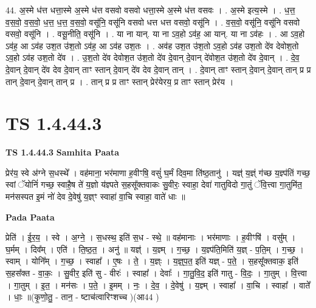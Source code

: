 \documentclass[17pt]{extarticle}
\begin{document}
44. अ॒स्मे ध॑त्त धत्ता॒स्मे अ॒स्मे ध॑त्त वसवो वसवो धत्ता॒स्मे अ॒स्मे ध॑त्त वसवः । . अ॒स्मे इत्य॒स्मे । . ध॒त्त॒ व॒स॒वो॒ व॒स॒वो॒ ध॒त्त॒ ध॒त्त॒ व॒स॒वो॒ वसू॑नि॒ वसू॑नि वसवो धत्त धत्त वसवो॒ वसू॑नि । . व॒स॒वो॒ वसू॑नि॒ वसू॑नि वसवो वसवो॒ वसू॑नि । . वसू॒नीति॒ वसू॑नि । . या ना यान्. या ना ऽव॒हो ऽव॑ह॒ आ यान्. या ना ऽव॑हः । . आ ऽव॒हो ऽव॑ह॒ आ ऽव॑ह उश॒त उ॑श॒तो ऽव॑ह॒ आ ऽव॑ह उश॒तः । . अव॑ह उश॒त उ॑श॒तो ऽव॒हो ऽव॑ह उश॒तो दे॑व देवोश॒तो ऽव॒हो ऽव॑ह उश॒तो दे॑व । . उ॒श॒तो दे॑व देवोश॒त उ॑श॒तो दे॑व दे॒वान् दे॒वान् दे॑वोश॒त उ॑श॒तो दे॑व दे॒वान् । . दे॒व॒ दे॒वान् दे॒वान् दे॑व देव दे॒वान् ताꣳ स्तान् दे॒वान् दे॑व देव दे॒वान् तान् । . दे॒वान् ताꣳ स्तान् दे॒वान् दे॒वान् तान् प्र प्र तान् दे॒वान् दे॒वान् तान् प्र । . तान् प्र प्र ताꣳ स्तान् प्रेर॑येरय॒ प्र ताꣳ स्तान् प्रेर॑य । \newline
\pagebreak
{}

\section{ TS 1.4.44.3 }

\textbf{TS 1.4.44.3 } \newline
\textbf{Samhita Paata} \newline

प्रेर॑य॒ स्वे अ॑ग्ने स॒धस्थे᳚ । वह॑माना॒ भर॑माणा ह॒वीꣳषि॒ वसुं॑ घ॒र्मं दिव॒मा ति॑ष्ठ॒तानु॑ । यज्ञ्॑ य॒ज्ञ्ं ग॑च्छ य॒ज्ञ्प॑तिं गच्छ॒ स्वां ॅयोनिं॑ गच्छ॒ स्वाहै॒ष ते॑ य॒ज्ञो य॑ज्ञ्पते स॒हसू᳚क्तवाकः सु॒वीरः॒ स्वाहा॒ देवा॑ गातुविदो गा॒तुं ॅवि॒त्त्वा गा॒तुमि॑त॒ मन॑सस्पत इ॒मं नो॑ देव दे॒वेषु॑ य॒ज्ञ्ꣳ स्वाहा॑ वा॒चि स्वाहा॒ वाते॑ धाः ॥ \newline

\textbf{Pada Paata} \newline

प्रेति॑ । ई॒र॒य॒ । स्वे । अ॒ग्ने॒ । स॒धस्थ॒ इति॑ स॒ध - स्थे॒ ॥ वह॑मानाः । भर॑माणाः । ह॒वीꣳषि॑ । वसु᳚म् । घ॒र्मम् । दिव᳚म् । एति॑ । ति॒ष्ठ॒त॒ । अनु॑ ॥ यज्ञ्॑ । य॒ज्ञ्म् । ग॒च्छ॒ । य॒ज्ञ्प॑ति॒मिति॑ य॒ज्ञ् - प॒ति॒म् । ग॒च्छ॒ । स्वाम् । योनि᳚म् । ग॒च्छ॒ । स्वाहा᳚ । ए॒षः । ते॒ । य॒ज्ञ्ः । य॒ज्ञ्॒प॒त॒ इति॑ यज्ञ् - प॒ते॒ । स॒हसू᳚क्तवाक॒ इति॑ स॒हस᳚क्त - वा॒कः॒ । सु॒वीर॒ इति॑ सु - वीरः॑ । स्वाहा᳚ । देवाः᳚ । गा॒तु॒वि॒द॒ इति॑ गातु - वि॒दः॒ । गा॒तुम् । वि॒त्त्वा । गा॒तुम् । इ॒त॒ । मन॑सः । प॒ते॒ । इ॒मम् । नः॒ । दे॒व॒ । दे॒वेषु॑ । य॒ज्ञ्म् । स्वाहा᳚ । वा॒चि । स्वाहा᳚ । वाते᳚ । धाः॒ ॥(कृ॒णो॒तु॒ - तान॒ - ष्टाच॑त्वारिꣳशच्च )(आ44 )  \newline
\end{document}

